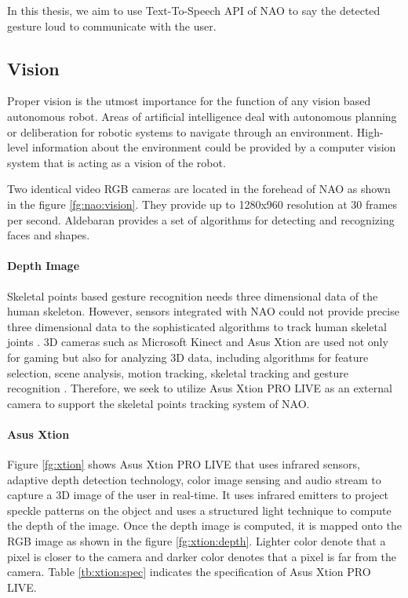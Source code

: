  

In this thesis, we aim to use Text-To-Speech API of NAO to say the detected gesture loud to communicate with the user.

\subsection{Vision} \label{sec:nao:vision} Proper vision is the utmost importance for the function of any vision based autonomous robot. Areas of artificial intelligence deal with autonomous planning or deliberation for robotic systems to navigate through an environment. High-level information about the environment could be provided by a computer vision system that is acting as a vision of the robot.



Two identical video RGB cameras are located in the forehead of NAO as shown in the figure \ref{fg:nao:vision}. They provide up to 1280x960 resolution at 30 frames per second. Aldebaran provides a set of algorithms for detecting and recognizing faces and shapes.

\paragraph*{Depth Image} Skeletal points based gesture recognition needs three dimensional data of the human skeleton. However, sensors integrated with NAO could not provide precise three dimensional data to the sophisticated algorithms to track human skeletal joints \cite{17}. 3D cameras such as Microsoft Kinect and Asus Xtion are used not only for gaming but also for analyzing 3D data, including algorithms for feature selection, scene analysis, motion tracking, skeletal tracking and gesture recognition \cite{9} \cite{18}. Therefore, we seek to utilize Asus Xtion PRO LIVE as an external camera to support the skeletal points tracking system of NAO. 





\paragraph*{Asus Xtion} Figure \ref{fg:xtion} shows Asus Xtion PRO LIVE that uses infrared sensors, adaptive depth detection technology, color image sensing and audio stream to capture a 3D image of the user in real-time. It uses infrared emitters to project speckle patterns on the object and uses a structured light technique to compute the depth of the image. Once the depth image is computed, it is mapped onto the RGB image as shown in the figure \ref{fg:xtion:depth}. Lighter color denote that a pixel is closer to the camera and darker color denotes that a pixel is far from the camera. Table \ref{tb:xtion:spec} indicates the specification of Asus Xtion PRO LIVE.

